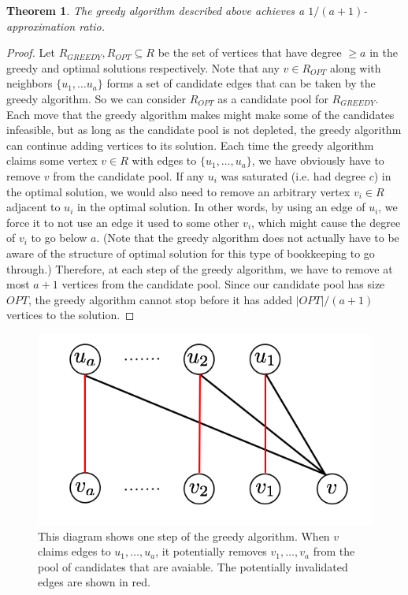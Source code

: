 \documentclass[11pt]{article}
\newtheorem{thm}{Theorem}
\begin{document}
\begin{thm}
The greedy algorithm described above achieves a $1/(a+1)$-approximation ratio.
\end{thm}
\begin{proof}
Let $R_{GREEDY}, R_{OPT}\subseteq R$ be the set of vertices that have
degree $\geq a$ in the greedy and optimal solutions respectively. Note
that any $v \in R_{OPT}$ along with neighbors $\{u_1,\ldots u_a\}$
forms a set of candidate edges that can be taken by the greedy
algorithm. So we can consider $R_{OPT}$ as a candidate pool for
$R_{GREEDY}$. Each move that the greedy algorithm makes might make
some of the candidates infeasible, but as long as the candidate pool
is not depleted, the greedy algorithm can continue adding vertices to
its solution. Each time the greedy algorithm claims some vertex $v\in
R$ with edges to $\{u_1,\ldots, u_a\}$, we have obviously have to
remove $v$ from the candidate pool. If any $u_i$ was saturated
(i.e. had degree $c$) in the optimal solution, we would also need to
remove an arbitrary vertex $v_i\in R$ adjacent to $u_i$ in the optimal
solution. In other words, by using an edge of $u_i$, we force it to
not use an edge it used to some other $v_i$, which might cause the
degree of $v_i$ to go below $a$. (Note that the greedy algorithm does
not actually have to be aware of the structure of optimal solution for
this type of bookkeeping to go through.) Therefore, at each step of
the greedy algorithm, we have to remove at most $a+1$ vertices from
the candidate pool. Since our candidate pool has size $OPT$, the
greedy algorithm cannot stop before it has added $|OPT|/(a+1)$
vertices to the solution.
\end{proof}

\begin{figure}[h]
\centering
\includegraphics[width=.5\textwidth]{greedy.png}
\begin{minipage}[h]{.8\linewidth}
\caption{This diagram shows one step of the greedy algorithm. When $v$ claims edges to $u_1,\ldots, u_a$, it potentially removes $v_1,\ldots, v_a$ from the pool of candidates that are avaiable. The potentially invalidated edges are shown in red.}
\end{minipage}
\end{figure}
\end{document}
